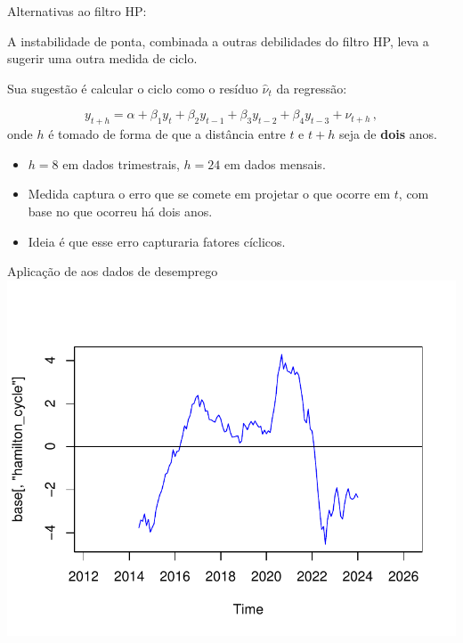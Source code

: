\documentclass[11pt]{beamer}
\newenvironment{halfwideitemize}{\itemize\addtolength{\itemsep}{0.5em}}{\enditemize}
\begin{document}
\begin{frame}{Alternativas ao filtro HP: \citet{Hamilton2019}}
	\begin{halfwideitemize}
		\item A instabilidade de ponta, combinada a outras debilidades do filtro HP, leva \citet{Hamilton2019} a sugerir uma outra medida de ciclo.
		\item Sua sugestão é calcular o ciclo como o resíduo $\hat{\nu}_t$ da regressão:
		
		$$y_{t+h} = \alpha+\beta_1 y_{t} + \beta_2 y_{t-1} + \beta_3 y_{t-2} + \beta_4 y_{t-3} + \nu_{t+h} \, ,$$
		onde $h$ é tomado de forma de que a distância entre $t$ e $t+h$ seja de \textbf{dois} anos.
		\begin{itemize}
			\item $h=8$ em dados trimestrais, $h=24$ em dados mensais.
			\item Medida captura o erro que se comete em projetar o que ocorre em $t$, com base no que ocorreu há dois anos.
			\item Ideia é que esse erro capturaria fatores cíclicos.
		\end{itemize}
	\end{halfwideitemize}
\end{frame}

\begin{frame}{Aplicação de \citet{Hamilton2019} aos dados de desemprego}
	\centering
	\includegraphics[scale=0.7]{graficos/hamilton.pdf}
\end{frame}
\end{document}
